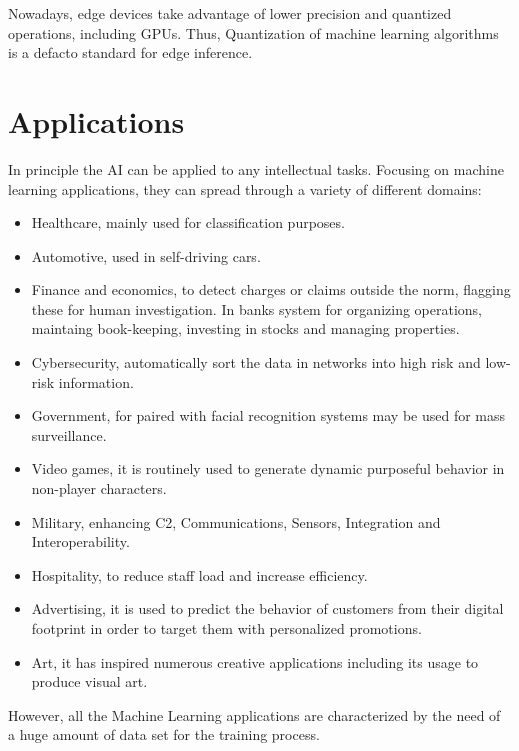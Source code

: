 Nowadays, edge devices take advantage of lower precision and quantized operations, including GPUs. Thus, Quantization of machine learning algorithms is a defacto standard for edge inference.

\section{Applications}
In principle the AI can be applied to any intellectual tasks. Focusing on machine learning applications, they can spread through a variety of different domains:
\begin{itemize}
\item Healthcare, mainly used for classification purposes.
\item Automotive, used in self-driving cars.
\item Finance and economics, to detect charges or claims outside the norm, flagging these for human investigation. In banks system for organizing operations, maintaing book-keeping, investing in stocks and managing properties.
\item Cybersecurity, automatically sort the data in networks into high risk and low-risk information.
\item Government, for paired with facial recognition systems may be used for mass surveillance.
\item Video games, it is routinely used to generate dynamic purposeful behavior in non-player characters.
\item Military, enhancing C2, Communications, Sensors, Integration and Interoperability.
\item Hospitality, to reduce staff load and increase efficiency.
\item Advertising, it is used to predict the behavior of customers from their digital footprint in order to target them with personalized promotions.
\item Art, it has inspired numerous creative applications including its usage to produce visual art.
\end{itemize}
However, all the Machine Learning applications are characterized by the need of a huge amount of data set for the training process.